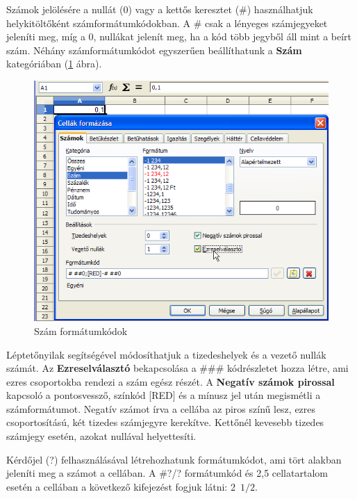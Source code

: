 Számok jelölésére a nullát (0) vagy a kettős keresztet
(\#) használhatjuk helykitöltőként
számformátumkódokban. A \# csak a lényeges számjegyeket
jeleníti meg, míg a 0, nullákat jelenít meg, ha a kód több
jegyből áll mint a beírt szám. Néhány
számformátumkódot egyszerűen beállíthatunk a
\textbf{Szám} kategóriában (\ref{SzámFormátumkódok} ábra).

\begin{figure}[!h]
\begin{center}
\includegraphics[width=15.027cm]{oocalcv2-img51.png}
\caption{Szám formátumkódok}\label{SzámFormátumkódok}
\end{center}
\end{figure}

Léptetőnyilak segítségével módosíthatjuk a tizedeshelyek
és a vezető nullák számát. Az \textbf{Ezreselválasztó}
bekapcsolása a \#\#\# kódrészletet hozza létre, ami ezres
csoportokba rendezi a szám egész részét. A \textbf{Negatív
számok pirossal} kapcsoló a pontosvessző, színkód [RED]
és a mínusz jel után megismétli a számformátumot. Negatív
számot írva a cellába az piros színű lesz, ezres
csoportosítású, két tizedes számjegyre kerekítve.
Kettőnél kevesebb tizedes számjegy esetén, azokat nullával
helyettesíti.

Kérdőjel (?) felhasználásával létrehozhatunk
formátumkódot, ami tört alakban jeleníti meg a számot a
cellában. A \#?/? formátumkód és 2,5 cellatartalom esetén a
cellában a következő kifejezést fogjuk látni: 2~$1/2$.


